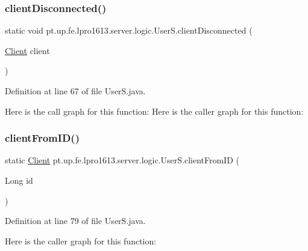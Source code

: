 \subsubsection{\texorpdfstring{client\+Disconnected()}{clientDisconnected()}}
{\footnotesize\ttfamily static void pt.\+up.\+fe.\+lpro1613.\+server.\+logic.\+User\+S.\+client\+Disconnected (\begin{DoxyParamCaption}\item[{\hyperlink{classpt_1_1up_1_1fe_1_1lpro1613_1_1server_1_1conn_1_1_client}{Client}}]{client }\end{DoxyParamCaption})\hspace{0.3cm}{\ttfamily [static]}}



Definition at line 67 of file User\+S.\+java.

Here is the call graph for this function\+:
Here is the caller graph for this function\+:
\hypertarget{classpt_1_1up_1_1fe_1_1lpro1613_1_1server_1_1logic_1_1_user_s_ac189b4e10d166dd53fb0e135c9565fbc}{}\label{classpt_1_1up_1_1fe_1_1lpro1613_1_1server_1_1logic_1_1_user_s_ac189b4e10d166dd53fb0e135c9565fbc} 
\subsubsection{\texorpdfstring{client\+From\+I\+D()}{clientFromID()}}
{\footnotesize\ttfamily static \hyperlink{classpt_1_1up_1_1fe_1_1lpro1613_1_1server_1_1conn_1_1_client}{Client} pt.\+up.\+fe.\+lpro1613.\+server.\+logic.\+User\+S.\+client\+From\+ID (\begin{DoxyParamCaption}\item[{Long}]{id }\end{DoxyParamCaption})\hspace{0.3cm}{\ttfamily [static]}}



Definition at line 79 of file User\+S.\+java.

Here is the caller graph for this function\+:
\hypertarget{classpt_1_1up_1_1fe_1_1lpro1613_1_1server_1_1logic_1_1_user_s_a92958d5006bbce1dbc15722f801d67ef}{}\label{classpt_1_1up_1_1fe_1_1lpro1613_1_1server_1_1logic_1_1_user_s_a92958d5006bbce1dbc15722f801d67ef} 
